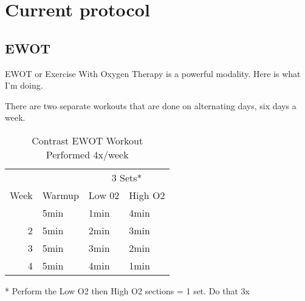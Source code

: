 \documentclass[
  letterpaper,
  DIV=11,
  numbers=noendperiod]{scrreprt}
\begin{document}
\section{Current protocol}\label{current-protocol}

\subsection{EWOT}\label{ewot}

EWOT or Exercise With Oxygen Therapy is a powerful modality. Here is
what I'm doing.

There are two separate workouts that are done on alternating days, six
days a week.

\begin{table}
\caption*{
{\large Contrast EWOT Workout} \\ 
{\small Performed 4x/week}
} 
\fontsize{12.0pt}{14.4pt}\selectfont
\begin{tabular*}{1\linewidth}{@{\extracolsep{\fill}}rlll}
\toprule
 &  & \multicolumn{2}{c}{3 Sets*} \\ 
\cmidrule(lr){3-4}
Week & Warmup & Low 02 & High O2 \\ 
\midrule\addlinespace[2.5pt]
1 & 5min & 1min & 4min \\ 
2 & 5min & 2min & 3min \\ 
3 & 5min & 3min & 2min \\ 
4 & 5min & 4min & 1min \\ 
\bottomrule
\end{tabular*}
\begin{minipage}{\linewidth}
* Perform the Low O2 then High O2 sections = 1 set. Do that 3x\\
\end{minipage}
\end{table}
\end{document}
